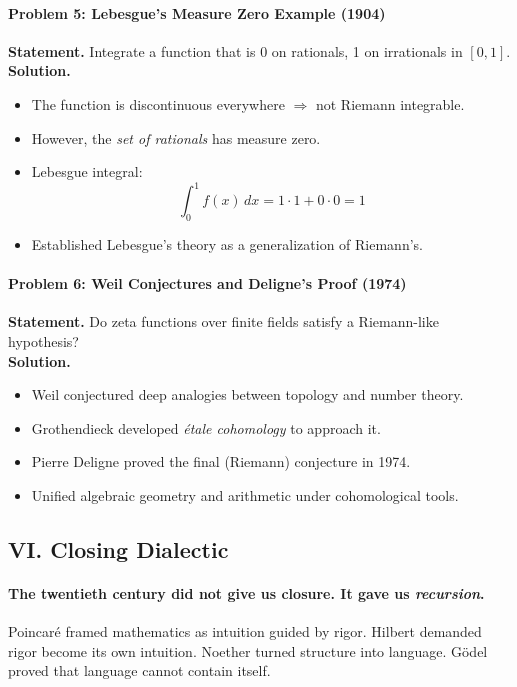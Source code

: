 \documentclass[9pt]{article}
\begin{document}
\paragraph{Problem 5: Lebesgue’s Measure Zero Example (1904)}
\textbf{Statement.} Integrate a function that is 0 on rationals, 1 on irrationals in \([0,1]\). \\
\textbf{Solution.}
\begin{itemize}
  \item The function is discontinuous everywhere \( \Rightarrow \) not Riemann integrable.
  \item However, the \textit{set of rationals} has measure zero.
  \item Lebesgue integral:
  \[
  \int_0^1 f(x)\, dx = 1 \cdot 1 + 0 \cdot 0 = 1
  \]
  \item Established Lebesgue’s theory as a generalization of Riemann’s.
\end{itemize}

\paragraph{Problem 6: Weil Conjectures and Deligne’s Proof (1974)}
\textbf{Statement.} Do zeta functions over finite fields satisfy a Riemann-like hypothesis? \\
\textbf{Solution.}
\begin{itemize}
  \item Weil conjectured deep analogies between topology and number theory.
  \item Grothendieck developed \textit{étale cohomology} to approach it.
  \item Pierre Deligne proved the final (Riemann) conjecture in 1974.
  \item Unified algebraic geometry and arithmetic under cohomological tools.
\end{itemize}

\newpage

\subsection*{VI. Closing Dialectic}

\paragraph{
The twentieth century did not give us closure. It gave us \textit{recursion}.
}

Poincaré framed mathematics as intuition guided by rigor. Hilbert demanded rigor become its own intuition. Noether turned structure into language. Gödel proved that language cannot contain itself.\\
\end{document}
